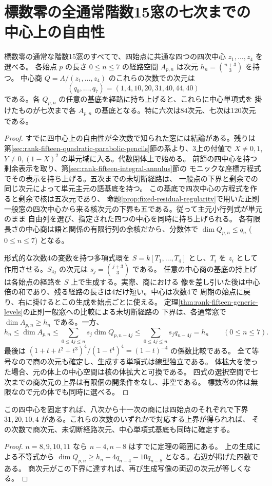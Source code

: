 \section{標数零の全通常階数15窓の七次までの中心上の自由性}
\label{sec:rank-fifteen-truncated-central-freeness}
\begin{theorem}
標数零の通常な階数15窓のすべてで、四始点に共通な四つの四次中心 $z_1,\ldots,z_4$ を選べる。
各始点 $p$ の長さ $0\le n\le7$ の経路空間 $A_{p,n}$ は次元 $h_n=\binom{n+3}{3}$ を持つ。
中心商 $Q=A/(z_1,\ldots,z_4)$ のこれらの次数での次元は
\[
             (q_0,\ldots,q_7)=(1,4,10,20,31,40,44,40)
\]
である。各 $Q_{p,n}$ の任意の基底を経路に持ち上げると、これらに中心単項式を
掛けたものが七次まで各 $A_{p,n}$ の基底となる。特に六次は84次元、七次は120次元である。
\end{theorem}
\begin{proof}
すでに四中心上の自由性が全次数で知られた窓には結論がある。残りは
第\ref{sec:rank-fifteen-quadratic-parabolic-pencils}節の系より、3上の付値で
$X\ne0,1$, $Y\ne0,(1-X)^2$ の単元域に入る。代数閉体上で始める。
前節の四中心を持つ剰余表示を取り、第\ref{sec:rank-fifteen-integral-annulus}節の
モニックな座標方程式でその表示を持ち上げる。五次までの未切断経路は、
一般点の下界と剰余での同じ次元によって単元主元の語基底を持つ。
この基底で四次中心の方程式を作ると剰余で核は五次元であり、
命題\ref{prop:fixed-residual-regularity}で用いた正則一般窓の四次中心から来る核次元の下界も五である。従って主元小行列式が単元のまま
自由列を選び、指定された四つの中心を同時に持ち上げられる。
各有限長さの中心商は語と関係の有限行列の余核だから、分数体で
$\dim Q_{p,n}\le q_n$ ($0\le n\le7$) となる。

形式的な次数4の変数を持つ多項式環を $S=k[T_1,\ldots,T_4]$ とし、$T_i$ を
$z_i$ として作用させる。$S_{4j}$ の次元は $s_j=\binom{j+3}{3}$ である。
任意の中心商の基底の持上げは各始点の経路を $S$ 上で生成する。実際、商における
像を差し引いた後は中心倍の和であり、残る経路の長さは4だけ短い。中心は次数4で
周期の始点に戻り、右に掛けるとこの生成を始点ごとに使える。
定理\ref{thm:rank-fifteen-generic-levels}の正則一般窓への比較による未切断経路の
下界は、各通常窓で $\dim A_{p,n}\ge h_n$ である。一方、
\[
 h_n\le \dim A_{p,n}\le\sum_{0\le4j\le n}s_j\dim Q_{p,n-4j}
 \le\sum_{0\le4j\le n}s_j q_{n-4j}=h_n
 \qquad(0\le n\le7).
\]
最後は $(1+t+t^2+t^3)^4/(1-t^4)^4=(1-t)^{-4}$ の係数比較である。
全て等号なので商の次元も確定し、生成する単項式は線型独立である。
体拡大を使った場合、元の体上の中心空間は核の体拡大と可換である。
四式の選択空間で七次までの商次元の上界は有限個の開条件をなし、非空である。
標数零の体は無限なので元の体でも同時に選べる。
\end{proof}
\begin{corollary}
この四中心を固定すれば、八次から十一次の商には四始点のそれぞれで下界
$31,20,10,4$ がある。これらの次数のいずれかで対応する上界が得られれば、
その次数で商次元、未切断経路次元、中心単項式基底も同時に確定する。
\end{corollary}
\begin{proof}
$n=8,9,10,11$ なら $n-4,n-8$ はすでに定理の範囲にある。
上の生成による不等式から
$\dim Q_{p,n}\ge h_n-4q_{n-4}-10q_{n-8}$ となる。右辺が掲げた四数である。
商次元がこの下界に達すれば、再び生成写像の両辺の次元が等しくなる。
\end{proof}
